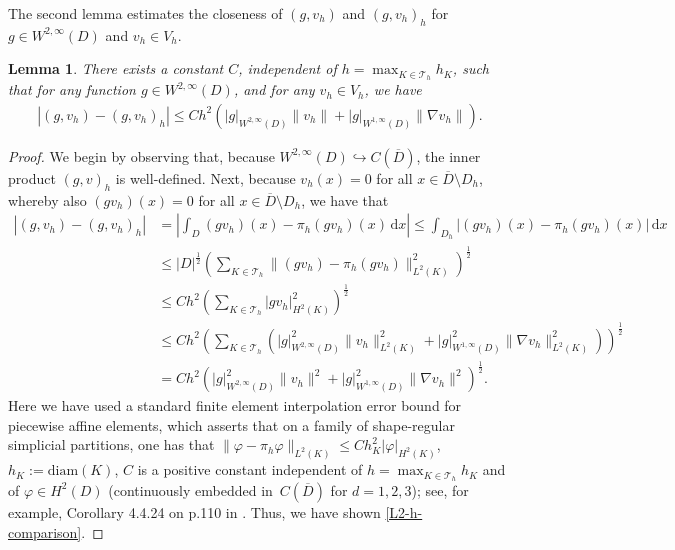\documentclass[12pt]{article}
\newtheorem{lemma}{Lemma}[section]
\newcommand{\dd}{\,\mathrm{d}}
\begin{document}
{The second lemma estimates the closeness of $(g,v_h)$ and $(g,v_h)_h$ for $g \in W^{2,\infty}(D)$ and $v_h \in V_h$.

\begin{lemma}\label{L2-h-scalar-product}
    There exists a constant $C$,  independent of $h= \max_{K \in \mathcal{T}_h} h_K$, 
    such that for any function $g \in W^{2,\infty}(D)$,  and for any $v_h \in V_h$, we have 
    \begin{align}\label{L2-h-comparison}
    |(g,v_h) - (g,v_h)_h| \leq C  h^2 \left(|g|_{W^{2,\infty}(D)}\|v_h\| + |g|_{W^{1,\infty}(D)}\|\nabla v_h\| \right).
    \end{align}
\end{lemma}


%
\begin{proof} We begin by observing that, because $ W^{2,\infty}(D)\hookrightarrow C(\overline{D})$, the inner product $(g,v)_h$ is well-defined. Next, because $v_h(x)=0$ for all $x \in \overline{D}\setminus D_h$, whereby also $(gv_h)(x)=0$ for all $x \in \overline{D}\setminus D_h$, we have that
\begin{align*} 
|(g,v_h) - (g,v_h)_h| & = \left|\int_{D} (gv_h)(x) - \pi_h(g v_h)(x) \dd x \right| \leq \int_{D_h} | (gv_h)(x) - \pi_h(g v_h)(x)| \dd x\\
& \leq   |D|^{\frac{1}{2}} \left(\sum_{K \in \mathcal{T}_h} \|(gv_h) - \pi_h(g v_h)\|^2_{L^2(K)} \right)^{\frac{1}{2}}\\
& \leq C h^2 \left(\sum_{K \in \mathcal{T}_h} |gv_h|^2_{H^2(K)} \right)^{\frac{1}{2}}\\
& \leq C  h^2 \left(\sum_{K \in \mathcal{T}_h}  \left(|g|^2_{W^{2,\infty}(D)}\|v_h\|^2_{L^2(K)} + |g|^2_{W^{1,\infty}(D)}\|\nabla v_h\|^2_{L^2(K)} \right)\right)^{\frac{1}{2}}\\
& = C  h^2 \left(|g|^2_{W^{2,\infty}(D)}\|v_h\|^2 + |g|^2_{W^{1,\infty}(D)}\|\nabla v_h\|^2 \right)^{\frac{1}{2}}.
\end{align*}
%
Here we have used a standard finite element interpolation error bound for piecewise affine elements, which asserts that on a family of shape-regular simplicial partitions, one has that $\|\varphi - \pi_h \varphi\|_{L^2(K)} \leq C h_K^2|\varphi|_{H^2(K)}$, $h_K:=\mbox{diam}(K)$, $C$ is a positive constant independent of $h= \max_{K \in \mathcal{T}_h} h_K$ and of $\varphi \in H^2(D)$ (continuously embedded in~$C(\overline D)$ for $d=1, 2, 3$); see, for example, Corollary 4.4.24 on p.110 in \cite{MR2373954}. Thus, we have shown \eqref{L2-h-comparison}.
\end{proof}

}
\end{document}
